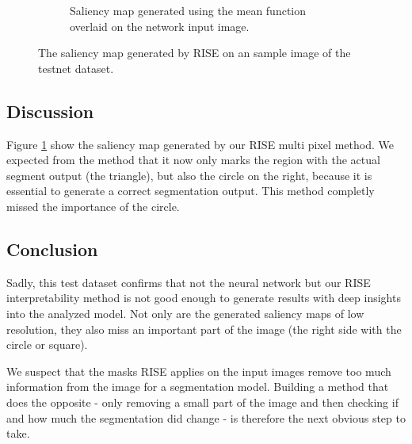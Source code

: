 \begin{figure}[H]
\begin{subfigure}[t]{.5\textwidth}
        \caption{Saliency map generated using the mean function overlaid on the network input image.}
    \end{subfigure}
    \caption{The saliency map generated by RISE on an sample image of the testnet dataset.}
    \label{testnet_rise_mean}
\end{figure}

\subsection{Discussion}
Figure \ref{testnet_rise_mean} show the saliency map generated by our RISE multi pixel method. We expected from the method that it now only marks the region with the actual segment output (the triangle), but also the circle on the right, because it is essential to generate a correct segmentation output. This method completly missed the importance of the circle.

\subsection{Conclusion}
Sadly, this test dataset confirms that not the neural network but our RISE interpretability method is not good enough to generate results with deep insights into the analyzed model. Not only are the generated saliency maps of low resolution, they also miss an important part of the image (the right side with the circle or square).

We suspect that the masks RISE applies on the input images remove too much information from the image for a segmentation model. Building a method that does the opposite - only removing a small part of the image and then checking if and how much the segmentation did change - is therefore the next obvious step to take.
